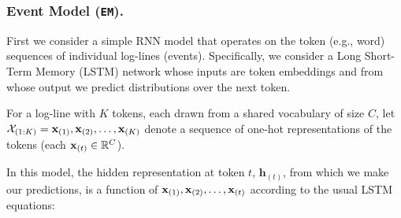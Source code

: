 \documentclass[letterpaper]{article} %
\begin{document}
\subsubsection{Event Model (\texttt{EM}).}\label{subsec:simplemodel}
First we consider a simple RNN model that operates on the token (e.g., word) sequences of individual log-lines (events).
Specifically, we consider a Long Short-Term Memory (LSTM) \cite{hochreiter1997long}
network whose inputs are token embeddings and from whose output we predict distributions over the next token.

For a log-line with $K$ tokens, each drawn from a shared vocabulary of size $C$, let $\mathcal{X}_{(1:K)} = {\bf x}_{(1)}, {\bf x}_{(2)}, \dots, {\bf x}_{(K)}$ denote a sequence of one-hot representations of the tokens (each ${\bf x}_{(t)} \in \mathbb{R}^C$).

In this model, the hidden representation at token $t$, $\textbf{h}_{(t)}$, from which we make our predictions, is a function of ${\bf x}_{(1)}, {\bf x}_{(2)}, \dots, {\bf x}_{(t)}$ according to the usual LSTM equations:
\end{document}
